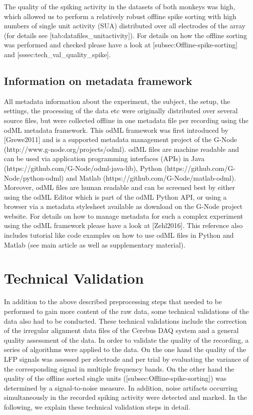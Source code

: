 {The quality of the spiking activity in the datasets of both monkeys was high, which allowed us to perform a relatively robust offline spike sorting with high numbers of single unit activity (SUA) distributed over all electrodes of the array (for details see [tab:datafiles\_unitactivity]). For details on how the offline sorting was performed and checked please have a look at [subsec:Offline-spike-sorting] and [sssec:tech\_val\_quality\_spike]. 

\subsection{Information on metadata framework}

 All metadata information about the experiment, the subject, the setup, the settings, the processing of the data etc were originally distributed over several source files, but were collected offline in one metadata file per recording using the odML metadata framework. This odML framework was first introduced by [Grewe2011] and is a supported metadata management project of the G-Node (http://www.g-node.org/projects/odml). odML files are machine readable and can be used via application programming interfaces (APIs) in Java (https://github.com/G-Node/odml-java-lib), Python (https://github.com/G-Node/python-odml) and Matlab (https://github.com/G-Node/matlab-odml). Moreover, odML files are human readable and can be screened best by either using the odML Editor which is part of the odML Python API, or using a browser via a metadata stylesheet available as download on the G-Node project website. For details on how to manage metadata for such a complex experiment using the odML framework please have a look at [Zehl2016]. This reference also includes tutorial like code examples on how to use odML files in Python and Matlab (see main article as well as supplementary material).

\section{Technical Validation}

In addition to the above described preprocessing steps that needed to be performed to gain more content of the raw data, some technical validations of the data also had to be conducted. These technical validations include the correction of the irregular alignment data files of the Cerebus DAQ system and a general quality assessment of the data. In order to validate the quality of the recording, a series of algorithms were applied to the data. On the one hand the quality of the LFP signals was assessed per electrode and per trial by evaluating the variance of the corresponding signal in multiple frequency bands. On the other hand the quality of the offline sorted single units ([subsec:Offline-spike-sorting]) was determined by a signal-to-noise measure. In addition, noise artifacts occurring simultaneously in the recorded spiking activity were detected and marked. In the following, we explain these technical validation steps in detail.

}
